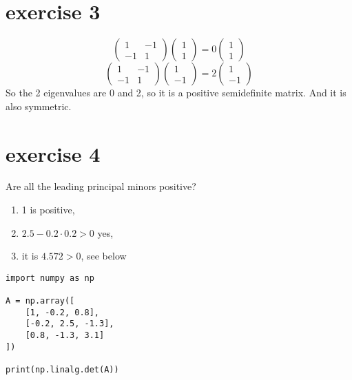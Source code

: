 \documentclass{article}
\begin{document}
\section{exercise 3}
\[\left( {\begin{array}{*{20}{c}}
            1      & { - 1} \\
            { - 1} & 1
        \end{array}} \right)\left( {\begin{array}{*{20}{c}}
            1 \\
            1
        \end{array}} \right) = 0\left( {\begin{array}{*{20}{c}}
            1 \\
            1
        \end{array}} \right)\]
\[\left( {\begin{array}{*{20}{c}}
            1      & { - 1} \\
            { - 1} & 1
        \end{array}} \right)\left( {\begin{array}{*{20}{c}}
            1 \\
            { - 1}
        \end{array}} \right) = 2\left( {\begin{array}{*{20}{c}}
            1 \\
            -1
        \end{array}} \right)\]
So the 2 eigenvalues are 0 and 2, so it is a positive semidefinite matrix. And it is also symmetric.

\section{exercise 4}
Are all the leading principal minors positive?
\begin{enumerate}
    \item 1 is positive,
    \item $2.5-0.2\cdot0.2>0$ yes,
    \item it is $4.572>0$, see below
\end{enumerate}

\begin{verbatim}
import numpy as np

A = np.array([
    [1, -0.2, 0.8],
    [-0.2, 2.5, -1.3],
    [0.8, -1.3, 3.1]
])

print(np.linalg.det(A))

\end{verbatim}
\end{document}

